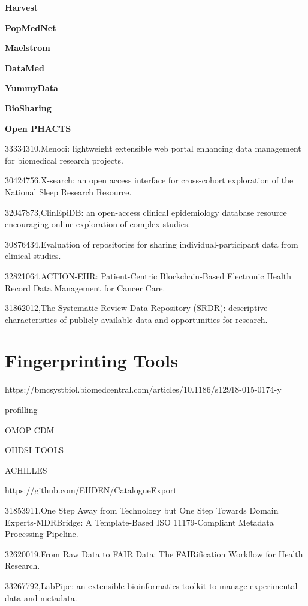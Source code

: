 \textbf{Harvest \cite{harvest}}

\textbf{PopMedNet \cite{popmednet}}

\textbf{Maelstrom \cite{maelstrom}}

\textbf{DataMed \cite{datamed}}

\textbf{YummyData \cite{yummydata}}

\textbf{BioSharing \cite{biosharing}}

\textbf{Open PHACTS \cite{phacts}}

33334310,Menoci: lightweight extensible web portal enhancing data management for biomedical research projects.

30424756,X-search: an open access interface for cross-cohort exploration of the National Sleep Research Resource.

32047873,ClinEpiDB: an open-access clinical epidemiology database resource encouraging online exploration of complex studies.

30876434,Evaluation of repositories for sharing individual-participant data from clinical studies.

32821064,ACTION-EHR: Patient-Centric Blockchain-Based Electronic Health Record Data Management for Cancer Care.

31862012,The Systematic Review Data Repository (SRDR): descriptive characteristics of publicly available data and opportunities for research.

\section{Fingerprinting Tools}

https://bmcsystbiol.biomedcentral.com/articles/10.1186/s12918-015-0174-y

\cite{maelstrom}

profilling

OMOP CDM

OHDSI TOOLS 

ACHILLES

https://github.com/EHDEN/CatalogueExport

31853911,One Step Away from Technology but One Step Towards Domain Experts-MDRBridge: A Template-Based ISO 11179-Compliant Metadata Processing Pipeline.

32620019,From Raw Data to FAIR Data: The FAIRification Workflow for Health Research.

33267792,LabPipe: an extensible bioinformatics toolkit to manage experimental data and metadata.

